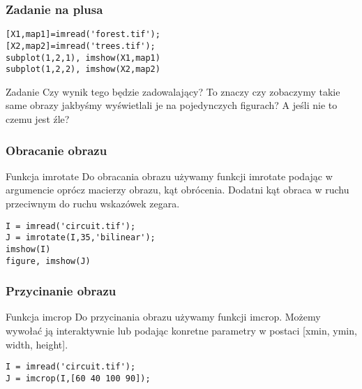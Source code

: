 \documentclass{beamer}
\begin{document}
\begin{frame}[fragile]
\frametitle{Zadanie na plusa}
\begin{example}
\begin{lstlisting}
[X1,map1]=imread('forest.tif');
[X2,map2]=imread('trees.tif');
subplot(1,2,1), imshow(X1,map1)
subplot(1,2,2), imshow(X2,map2)
\end{lstlisting}
\end{example}

\begin{alertblock}{Zadanie}
Czy wynik tego będzie zadowalający? To znaczy czy zobaczymy takie same obrazy jakbyśmy wyświetlali je na pojedynczych figurach? A jeśli nie to czemu jest źle?
\end{alertblock}

\end{frame}

\begin{frame}[fragile]
\frametitle{Obracanie obrazu}

\begin{block}{Funkcja imrotate}
Do obracania obrazu używamy funkcji imrotate podając w argumencie oprócz macierzy obrazu, kąt obrócenia. Dodatni kąt obraca w ruchu przeciwnym do ruchu wskazówek zegara.
\end{block}

\begin{example}
\begin{lstlisting}
I = imread('circuit.tif');
J = imrotate(I,35,'bilinear');
imshow(I)
figure, imshow(J)
\end{lstlisting}
\end{example}

\end{frame}


\begin{frame}[fragile]
\frametitle{Przycinanie obrazu}
\begin{block}{Funkcja imcrop}
Do przycinania obrazu używamy funkcji imcrop. Możemy wywołać ją interaktywnie lub podając konretne parametry w postaci [xmin, ymin, width, height].
\end{block}

\begin{example}
\begin{lstlisting}
I = imread('circuit.tif');
J = imcrop(I,[60 40 100 90]);
\end{lstlisting}
\end{example}

\end{frame}
\end{document}
